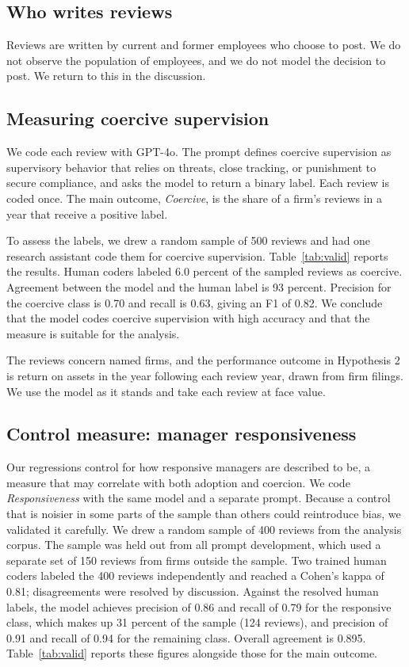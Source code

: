 \documentclass[12pt]{article}
\begin{document}
\subsection{Who writes reviews}
Reviews are written by current and former employees who choose to post. We do not observe the population of employees, and we do not model the decision to post. We return to this in the discussion.

\subsection{Measuring coercive supervision}
We code each review with GPT-4o. The prompt defines coercive supervision as supervisory behavior that relies on threats, close tracking, or punishment to secure compliance, and asks the model to return a binary label. Each review is coded once. The main outcome, \emph{Coercive}, is the share of a firm's reviews in a year that receive a positive label.

To assess the labels, we drew a random sample of 500 reviews and had one research assistant code them for coercive supervision. Table~\ref{tab:valid} reports the results. Human coders labeled 6.0 percent of the sampled reviews as coercive. Agreement between the model and the human label is 93 percent. Precision for the coercive class is 0.70 and recall is 0.63, giving an F1 of 0.82. We conclude that the model codes coercive supervision with high accuracy and that the measure is suitable for the analysis.

The reviews concern named firms, and the performance outcome in Hypothesis 2 is return on assets in the year following each review year, drawn from firm filings. We use the model as it stands and take each review at face value.

\subsection{Control measure: manager responsiveness}
Our regressions control for how responsive managers are described to be, a measure that may correlate with both adoption and coercion. We code \emph{Responsiveness} with the same model and a separate prompt. Because a control that is noisier in some parts of the sample than others could reintroduce bias, we validated it carefully. We drew a random sample of 400 reviews from the analysis corpus. The sample was held out from all prompt development, which used a separate set of 150 reviews from firms outside the sample. Two trained human coders labeled the 400 reviews independently and reached a Cohen's kappa of 0.81; disagreements were resolved by discussion. Against the resolved human labels, the model achieves precision of 0.86 and recall of 0.79 for the responsive class, which makes up 31 percent of the sample (124 reviews), and precision of 0.91 and recall of 0.94 for the remaining class. Overall agreement is 0.895. Table~\ref{tab:valid} reports these figures alongside those for the main outcome.
\end{document}

